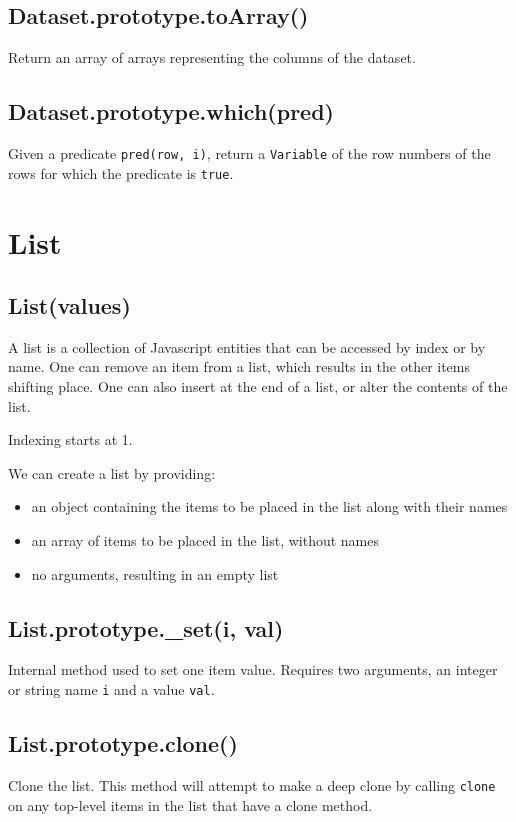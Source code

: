 \documentclass{article}
\begin{document}
    \subsection{Dataset.prototype.toArray()}
    Return an array of arrays representing the columns of the dataset.


    \subsection{Dataset.prototype.which(pred)}
    Given a predicate \texttt{pred(row, i)}, return a \texttt{Variable} of the row numbers of the
rows for which the predicate is \texttt{true}.


  \section{List}
    \subsection{List(values)}
    A list is a collection of Javascript entities that can be accessed by index
or by name. One can remove an item from a list, which results in the other
items shifting place. One can also insert at the end of a list, or alter the
contents of the list.


Indexing starts at 1.


We can create a list by providing:


\begin{itemize}

\item an object containing the items to be placed in the list along with their names

\item an array of items to be placed in the list, without names

\item no arguments, resulting in an empty list

\end{itemize}

    \subsection{List.prototype.\_set(i, val)}
    Internal method used to set one item value. Requires two arguments,
an integer or string name \texttt{i} and a value \texttt{val}.


    \subsection{List.prototype.clone()}
    Clone the list. This method will attempt to make a deep clone by calling \texttt{clone}
on any top-level items in the list that have a clone method.
\end{document}
